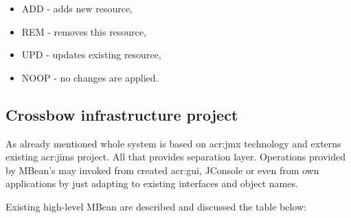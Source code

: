 \documentclass[11pt]{book}
\begin{document}
		\begin{itemize}
			\item {ADD - adds new resource,}
			\item {REM - removes this resource,}
			\item {UPD - updates existing resource,}
			\item {NOOP - no changes are applied.}
		\end{itemize}
		
		\subsection{Crossbow infrastructure project}
			\label{sec:impl:infrastructure}
			
			As already mentioned whole system is based on \gls{acr:jmx} technology and externs existing \gls{acr:jims} project. All that
			provides separation layer. Operations provided by MBean's may invoked from created \gls{acr:gui}, JConsole or even
			from own applications by just adapting to existing interfaces and object names. 
			
			Existing high-level MBean are described and discussed the table below:
\end{document}
